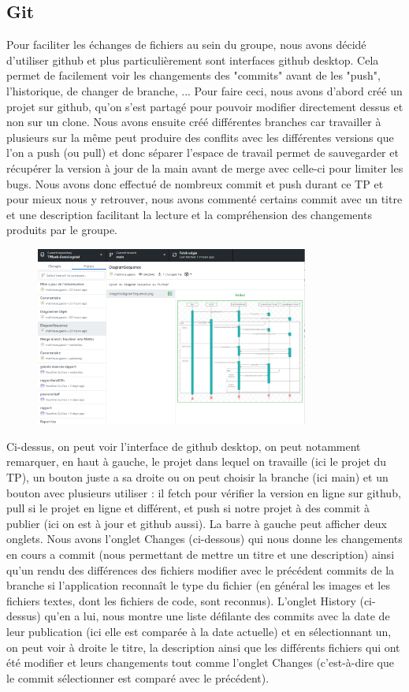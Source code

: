 \documentclass{article}
\begin{document}
\subsection{Git}
Pour faciliter les échanges de fichiers au sein du groupe, nous avons décidé d'utiliser github et plus particulièrement sont interfaces github desktop. Cela permet de facilement voir les changements des "commits" avant de les "push", l'historique, de changer de branche, ... Pour faire ceci, nous avons d'abord créé un projet sur github, qu'on s'est partagé pour pouvoir modifier directement dessus et non sur un clone. Nous avons ensuite créé différentes branches car travailler à plusieurs sur la même peut produire des conflits avec les différentes versions que l'on a push (ou pull) et donc séparer l'espace de travail permet de sauvegarder et récupérer la version à jour de la main avant de merge avec celle-ci pour limiter les bugs. Nous avons donc effectué de nombreux commit et push durant ce TP et pour mieux nous y retrouver, nous avons commenté certains commit avec un titre et une description facilitant la lecture et la compréhension des changements produits par le groupe. 
\begin{figure}[h]
\includegraphics[width=0.8\textwidth]{interface githubdesktop}
\end{figure}
\newpage
Ci-dessus, on peut voir l'interface de github desktop, on peut notamment remarquer, en haut à gauche, le projet dans lequel on travaille (ici le projet du TP), un bouton juste a sa droite ou on peut choisir la branche (ici main) et un bouton avec plusieurs utiliser : il fetch pour vérifier la version en ligne sur github, pull si le projet en ligne et différent, et push si notre projet à des commit à publier (ici on est à jour et github aussi). La barre à gauche peut afficher deux onglets. Nous avons l'onglet Changes (ci-dessous) qui nous donne les changements en cours a commit (nous permettant de mettre un titre et une description) ainsi qu'un rendu des différences des fichiers modifier avec le précédent commits de la branche si l'application reconnaît le type du fichier (en général les images et les fichiers textes, dont les fichiers de code, sont reconnus). L'onglet History (ci-dessus) qu'en a lui, nous montre une liste défilante des commits avec la date de leur publication (ici elle est comparée à la date actuelle) et en sélectionnant un, on peut voir à droite le titre, la description ainsi que les différents fichiers qui ont été modifier et leurs changements tout comme l'onglet Changes (c’est-à-dire que le commit sélectionner est comparé avec le précédent).
\end{document}
